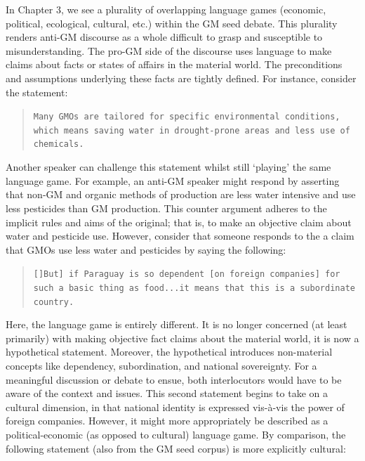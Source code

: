 In Chapter 3, we see a plurality of overlapping language games (economic, political, ecological, cultural, etc.) within the GM seed debate. This plurality renders anti-GM discourse as a whole difficult to grasp and susceptible to misunderstanding. The pro-GM side of the discourse uses language to make claims about facts or states of affairs in the material world. The preconditions and assumptions underlying these facts are tightly defined. For instance, consider the statement:

\begin{footnotesize}
\begin{quote}
\texttt{Many GMOs are tailored for specific environmental conditions, which means saving water in drought-prone areas and less use of chemicals.}
\end{quote}
\end{footnotesize}

Another speaker can challenge this statement whilst still `playing' the same language game. For example, an anti-GM speaker might respond by asserting that non-GM and organic methods of production are less water intensive and use less pesticides than GM production. This counter argument adheres to the implicit rules and aims of the original; that is, to make an objective claim about water and pesticide use. However, consider that someone responds to the a claim that GMOs use less water and pesticides by saying the following:

\begin{footnotesize}
\begin{quote}
\texttt{[]But] if Paraguay is so dependent [on foreign companies] for such a basic thing as food...it means that this is a subordinate country.}
\end{quote}
\end{footnotesize}

Here, the language game is entirely different. It is no longer concerned (at least primarily) with making objective fact claims about the material world, it is now a hypothetical statement. Moreover, the hypothetical introduces non-material concepts like dependency, subordination, and national sovereignty. For a meaningful discussion or debate to ensue, both interlocutors would have to be aware of the context and issues. This second statement begins to take on a cultural dimension, in that national identity is expressed vis-\`a-vis the power of foreign companies. However, it might more appropriately be described as a political-economic (as opposed to cultural) language game. By comparison, the following statement (also from the GM seed corpus) is more explicitly cultural: 

